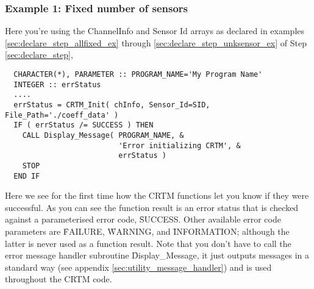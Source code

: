 \subsubsection{Example 1: Fixed number of sensors}
Here you're using the ChannelInfo and Sensor Id arrays as declared in examples \ref{sec:declare_step_allfixed_ex} through \ref{sec:declare_step_unksensor_ex} of Step \ref{sec:declare_step},
\begin{ttfamily}
  \begin{verbatim}
  CHARACTER(*), PARAMETER :: PROGRAM_NAME='My Program Name'
  INTEGER :: errStatus
  ....
  errStatus = CRTM_Init( chInfo, Sensor_Id=SID, File_Path='./coeff_data' )
  IF ( errStatus /= SUCCESS ) THEN 
    CALL Display_Message( PROGRAM_NAME, &
                          'Error initializing CRTM', & 
                          errStatus )
    STOP
  END IF\end{verbatim}
\end{ttfamily}
Here we see for the first time how the CRTM functions let you know if they were successful. As you can see the function result is an error status that is checked against a parameterised error code, \f{SUCCESS}. Other available error code parameters are \f{FAILURE}, \f{WARNING}, and \f{INFORMATION}; although the latter is never used as a function result. Note that you don't have to call the error message handler subroutine \f{Display\_Message}, it just outputs messages in a standard way (see appendix \ref{sec:utility_message_handler}) and is used throughout the CRTM code.

